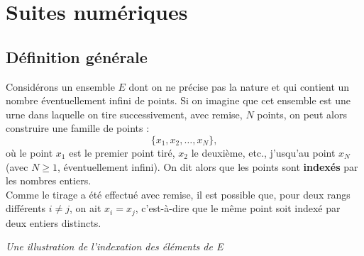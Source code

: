 \documentclass[frenchb]{report}
\begin{document}
\chapter{Suites numériques}

\section{Définition générale}

Considérons un ensemble $E$ dont on ne précise pas la nature et qui contient un nombre éventuellement infini de points. Si on imagine que cet ensemble est une urne dans laquelle on tire successivement, avec remise, $N$ points, on peut alors construire une famille de points :
\[ \{x_1, x_2, \dots, x_N \}, \]
où le point $x_1$ est le premier point tiré, $x_2$ le deuxième, etc., j'usqu'au point $x_N$ (avec $N \geq 1$, éventuellement infini). On dit alors que les points sont \textbf{indexés} par les nombres entiers. \\
Comme le tirage a été effectué avec remise, il est possible que, pour deux rangs différents $i \neq j$, on ait $x_i = x_j$, c'est-à-dire que le même point soit indexé par deux entiers distincts. \\

\begin{center}


\textit{Une illustration de l'indexation des éléments de E}

\end{center}
\end{document}
